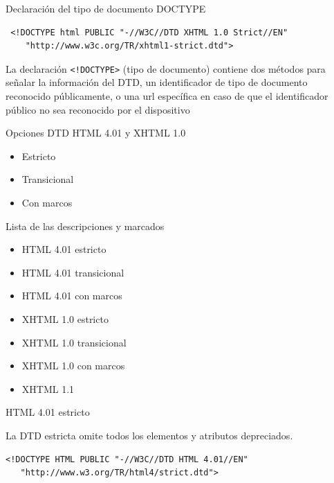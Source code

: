 \documentclass{beamer}
\begin{document}
\begin{frame}[fragile]{Declaración del tipo de documento DOCTYPE} %
    \begin{center}
       \begin{lstlisting}
 <!DOCTYPE html PUBLIC "-//W3C//DTD XHTML 1.0 Strict//EN"
    "http://www.w3c.org/TR/xhtml1-strict.dtd">
       \end{lstlisting}

       La declaración \texttt{<!DOCTYPE>} (tipo de documento) contiene dos
       métodos para señalar la información del DTD, un identificador de tipo de
       documento reconocido públicamente, o una url específica en caso de que
       el identificador público no sea reconocido por el dispositivo
    \end{center}
\end{frame}

\begin{frame}{Opciones DTD HTML 4.01 y XHTML 1.0} %
    \begin{center}
        \begin{itemize}
            \item Estricto
            \item Transicional
            \item Con marcos
        \end{itemize}
    \end{center}
\end{frame}

\begin{frame}{Lista de las descripciones y marcados} %
    \begin{center}
        \begin{itemize}
            \item HTML 4.01 estricto
            \item HTML 4.01 transicional
            \item HTML 4.01 con marcos 
            \item XHTML 1.0 estricto
            \item XHTML 1.0 transicional 
            \item XHTML 1.0 con marcos
            \item XHTML 1.1 
        \end{itemize}
    \end{center}
\end{frame}

\lstset{language=HTML}
\begin{frame}[fragile]{HTML 4.01 estricto} %
    \begin{center}
        La DTD estricta omite todos los elementos y atributos depreciados.
    \end{center}
    \begin{lstlisting}
<!DOCTYPE HTML PUBLIC "-//W3C//DTD HTML 4.01//EN"
   "http://www.w3.org/TR/html4/strict.dtd">
    \end{lstlisting} 
\end{frame}
\end{document}
